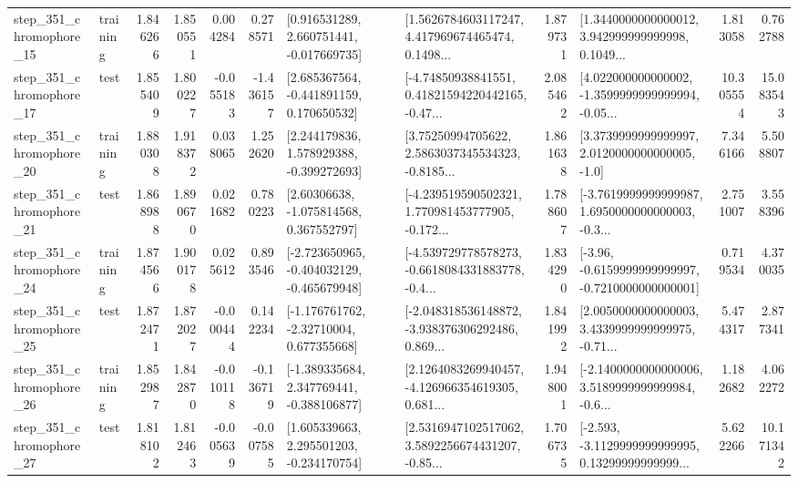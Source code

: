 \begin{tabular}{llrrrrllrlrr}
  step\_351\_chromophore\_15 &  training &      1.846266 &    1.850551 &      0.004284 &  0.278571 &    [0.916531289, 2.660751441, -0.017669735] &  [1.5626784603117247, 4.417969674465474, 0.1498... &       1.879731 &  [1.3440000000000012, 3.942999999999998, 0.1049... &            1.813058 &          0.762788 \\
  step\_351\_chromophore\_17 &      test &      1.855409 &    1.800227 &     -0.055183 & -1.436157 &    [2.685367564, -0.441891159, 0.170650532] &  [-4.74850938841551, 0.41821594220442165, -0.47... &       2.085462 &  [4.022000000000002, -1.3599999999999994, -0.05... &           10.305554 &         15.083543 \\
  step\_351\_chromophore\_20 &  training &      1.880308 &    1.918372 &      0.038065 &  1.252620 &    [2.244179836, 1.578929388, -0.399272693] &  [3.75250994705622, 2.5863037345534323, -0.8185... &       1.861638 &     [3.3739999999999997, 2.0120000000000005, -1.0] &            7.346166 &          5.508807 \\
  step\_351\_chromophore\_21 &      test &      1.868988 &    1.890670 &      0.021682 &  0.780223 &     [2.60306638, -1.075814568, 0.367552797] &  [-4.239519590502321, 1.770981453777905, -0.172... &       1.788607 &  [-3.7619999999999987, 1.6950000000000003, -0.3... &            2.751007 &          3.558396 \\
  step\_351\_chromophore\_24 &  training &      1.874566 &    1.900178 &      0.025612 &  0.893546 &  [-2.723650965, -0.404032129, -0.465679948] &  [-4.539729778578273, -0.6618084331883778, -0.4... &       1.834290 &  [-3.96, -0.6159999999999997, -0.7210000000000001] &            0.719534 &          4.370035 \\
  step\_351\_chromophore\_25 &      test &      1.872471 &    1.872027 &     -0.000444 &  0.142234 &    [-1.176761762, -2.32710004, 0.677355668] &  [-2.048318536148872, -3.938376306292486, 0.869... &       1.841992 &  [2.0050000000000003, 3.4339999999999975, -0.71... &            5.474317 &          2.877341 \\
  step\_351\_chromophore\_26 &  training &      1.852987 &    1.842870 &     -0.010118 & -0.136719 &   [-1.389335684, 2.347769441, -0.388106877] &  [2.1264083269940457, -4.126966354619305, 0.681... &       1.948001 &  [-2.1400000000000006, 3.5189999999999984, -0.6... &            1.182682 &          4.062272 \\
  step\_351\_chromophore\_27 &      test &      1.818102 &    1.812463 &     -0.005639 & -0.007585 &    [1.605339663, 2.295501203, -0.234170754] &  [2.5316947102517062, 3.5892256674431207, -0.85... &       1.706735 &  [-2.593, -3.1129999999999995, 0.13299999999999... &            5.622266 &         10.171342 \\

\end{tabular}
